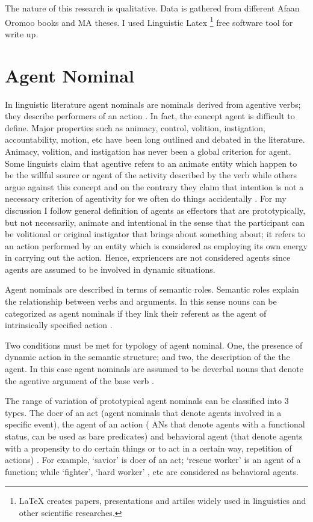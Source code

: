 \documentclass[11pt,a4paper]{article}
\begin{document}
The nature of this research is qualitative. Data is gathered from different Afaan Oromoo books and MA theses. I used Linguistic Latex \footnote{LaTeX creates papers, presentations and artiles widely used in linguistics and other scientific researches.} free software tool for write up. 

\section{Agent Nominal}

In linguistic literature agent nominals are nominals derived from agentive verbs; they describe performers of an action \cite{huyghe2020s}. In fact, the concept agent is difficult to define. Major properties  such as animacy, control, volition, instigation, accountability, motion, etc have been long outlined and debated in the literature. Animacy, volition, and instigation has never been a global criterion for agent. Some linguists claim that agentive refers to an animate entity which happen to be the willful source or agent of the activity described by the verb \cite{cruse1973some} while others argue against this concept and on the contrary they claim that intention is not a necessary criterion of agentivity for we often do things accidentally \cite{schlesinger1989instruments,caspar2015relationship}. For my discussion I follow \cite[p-188]{huyghe2020s} general definition of agents as effectors that are prototypically, but not necessarily, animate and intentional in the sense that the participant can be volitional or original instigator that brings about something about; it refers to an action performed by an entity which is considered as employing its own energy in carrying out the action. Hence, expriencers are not considered  agents since agents are assumed to be involved in dynamic situations. 


Agent nominals are described in terms of  semantic roles. Semantic roles explain the relationship between verbs and arguments. In this sense nouns can be categorized as agent nominals if they link their referent as the agent of intrinsically specified action \cite[p-189]{huyghe2020s}. 

Two conditions must be met for typology of agent nominal. One, the presence of dynamic action in the semantic structure; and two, the description of the the agent. In this case agent nominals are assumed to be deverbal nouns that denote the agentive argument of the base verb \cite[p-189-190]{huyghe2020s}.

The range of variation of prototypical agent nominals can be classified into 3 types. The doer of an act (agent nominals that denote agents involved in a specific event), the agent of an action ( ANs that denote agents with a functional status, can be used as bare predicates) and behavioral agent (that denote agents with a propensity to do certain things or to act in a certain way, repetition of actions) \cite[190-192]{huyghe2020s}. For example, ‘savior’  is doer of an act; ‘rescue worker’ is an agent of a function; while ‘fighter’, ‘hard worker’ , etc are considered as behavioral agents.
\end{document}

